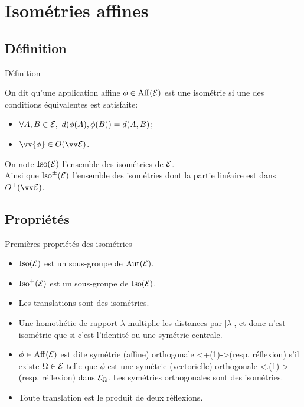 \documentclass[bigger]{m53beamer}
\begin{document}
\section{Isométries affines}

\subsection{Définition}
\begin{frame}{Définition}
  \begin{defprop}
    On dit qu'une application affine $\phi \in\operatorname{Aff}(\mathcal{E})$ est une \alert{isométrie} si une des conditions équivalentes est satisfaite:
    \begin{itemize}[<+(1)->]
      \item $\forall A,B \in \ens{E},\ d(\phi(A),\phi(B)) = d(A,B)$;
      \item $\vv{\phi} \in O(\ev{E})$.
    \end{itemize}
  \end{defprop}\pause
  On note \alert{$\operatorname{Iso}(\mathcal{E})$} l'ensemble des isométries de $\mathcal{E}$.\pause\\
  Ainsi que \alert{$\operatorname{Iso}^{\pm}(\mathcal{E})$} l'ensemble des isométries dont la partie linéaire est dans $O^{\pm}(\ev{E})$.
\end{frame}

\subsection{Propriétés}
\begin{frame}{Premières propriétés des isométries}
  \begin{itemize}[<+(1)->]
    \item $\operatorname{Iso}(\mathcal{E})$ est un sous-groupe de $\operatorname{Aut}(\mathcal{E})$.
    \item $\operatorname{Iso}^{+}(\mathcal{E})$ est un sous-groupe de $\operatorname{Iso}(\mathcal{E})$.
    \item Les translations sont des isométries.
    \item Une homothétie de rapport $\lambda$ multiplie les distances par $|\lambda|$\pause ,
      et donc n'est isométrie que si c'est l'identité ou une symétrie centrale.
    \item $\phi \in\operatorname{Aff}(\mathcal{E})$ est dite \alert{symétrie (affine) orthogonale} \uncover<+(1)->{(resp. \alert{réflexion})} s'il existe $\Omega \in \mathcal{E}$ telle que $\phi$ est une symétrie (vectorielle) orthogonale \uncover<.(1)->{(resp. réflexion)} dans $\mathcal{E}_{\Omega}$. \pause Les symétries orthogonales sont des isométries.
    \item Toute translation est le produit de deux réflexions.
  \end{itemize}
\end{frame}
\end{document}
